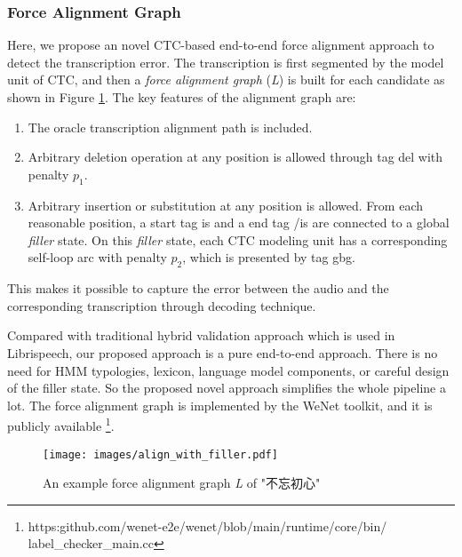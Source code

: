 \documentclass{article}
\begin{document}
\vspace{-1em}
\subsubsection{Force Alignment Graph}
\vspace{-0.5em}
Here, we propose an novel CTC-based end-to-end force alignment approach to detect the transcription error.
The transcription is first segmented by the model unit of CTC, and then a \textit{force alignment graph} (\textit{L}) is built for each candidate as shown in Figure \ref{fig:align_with_filler}. The key features of the alignment graph are:

\vspace{-0.5em}
\begin{enumerate}
    \item The oracle transcription alignment path is included.
    \vspace{-0.2em}
    \item Arbitrary deletion operation at any position is allowed through tag \textlangle{}del\textrangle{} with penalty $p_1$.
    \vspace{-0.2em}
    \item Arbitrary insertion or substitution at any position is allowed. From each reasonable position, a start tag \textlangle{}is\textrangle{} and a end tag \textlangle{}/is\textrangle{} are connected to a global \textit{filler} state. On this \textit{filler} state, each CTC modeling unit has a corresponding self-loop arc with penalty $p_2$, which is presented by tag \textlangle{}gbg\textrangle{}.
\end{enumerate}
\vspace{-0.5em}

This makes it possible to capture the error between the audio and the corresponding transcription through decoding technique.

Compared with traditional hybrid validation approach which is used in Librispeech, our proposed approach is a pure end-to-end approach. There is no need for HMM typologies, lexicon, language model components, or careful design of the filler state. So the proposed novel approach simplifies the whole pipeline a lot. The force
alignment graph is implemented by the WeNet toolkit, and it is publicly available \footnote{https:github.com/wenet-e2e/wenet/blob/main/runtime/core/bin/\\label\_checker\_main.cc}.

\begin{CJK*}{UTF8}{gbsn}

\begin{figure}[ht]
  \vspace{-1.5em}
  \centering
  \texttt{[image: images/align\_with\_filler.pdf]}
  \vspace{-2em}
  \caption{An example force alignment graph \textit{L} of "不忘初心"}
  \label{fig:align_with_filler}
  \vspace{-2em}
\end{figure}

\end{CJK*}
\end{document}
